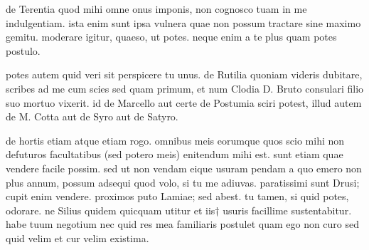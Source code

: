 


 de Terentia quod mihi omne onus imponis, non cognosco tuam in me indulgentiam. ista enim sunt ipsa vulnera quae non possum tractare sine maximo gemitu. moderare igitur, quaeso, ut potes. neque enim a te plus quam potes postulo.

 potes autem quid veri sit perspicere tu unus. de Rutilia quoniam videris dubitare, scribes ad me cum scies sed quam primum, et num Clodia D. Bruto consulari filio suo mortuo vixerit. id de Marcello aut certe de Postumia sciri potest, illud autem de M. Cotta aut de Syro aut de Satyro.

 de hortis etiam atque etiam rogo. omnibus meis eorumque quos scio mihi non defuturos facultatibus (sed potero meis) enitendum mihi est. sunt etiam quae vendere facile possim. sed ut non vendam eique usuram pendam a quo emero non plus annum, possum adsequi quod volo, si tu me adiuvas. paratissimi sunt Drusi; cupit enim vendere. proximos puto Lamiae; sed abest. tu tamen, si quid potes, odorare. ne Silius quidem quicquam utitur et iis† usuris facillime sustentabitur. habe tuum negotium nec quid res mea familiaris postulet quam ego non curo sed quid velim et cur velim existima.

